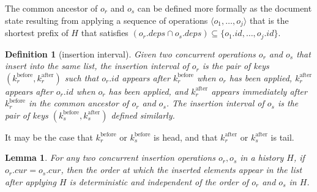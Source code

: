 \documentclass[10pt,journal,compsoc]{IEEEtran}
\newtheorem{definition}{Definition}
\newtheorem{lemma}[theorem]{Lemma}
\begin{document}
The common ancestor of $o_r$ and $o_s$ can be defined more formally as the document state resulting from applying a sequence of operations $\langle o_1, \dots, o_j \rangle$ that is the shortest prefix of $H$ that satisfies $(o_r.\mathit{deps} \cap o_s.\mathit{deps}) \subseteq \{o_1.\mathit{id}, \dots, o_j.\mathit{id}\}$.

\begin{definition}[insertion interval]\label{def:insert-interval}
Given two concurrent operations $o_r$ and $o_s$ that insert into the same list, the \emph{insertion interval} of $o_r$ is the pair of keys $(k_r^\mathrm{before}, k_r^\mathrm{after})$ such that $o_r.\mathit{id}$ appears after $k_r^\mathrm{before}$ when $o_r$ has been applied, $k_r^\mathrm{after}$ appears after $o_r.\mathit{id}$ when $o_r$ has been applied, and $k_r^\mathrm{after}$ appears immediately after $k_r^\mathrm{before}$ in the common ancestor of $o_r$ and $o_s$. The insertion interval of $o_s$ is the pair of keys $(k_s^\mathrm{before}, k_s^\mathrm{after})$ defined similarly.
\end{definition}

It may be the case that $k_r^\mathrm{before}$ or $k_s^\mathrm{before}$ is \textsf{head}, and that $k_r^\mathrm{after}$ or $k_s^\mathrm{after}$ is \textsf{tail}.

\begin{lemma}\label{lem:insert-conflict}
For any two concurrent insertion operations $o_r, o_s$ in a history $H$, if $o_r.\mathit{cur} = o_s.\mathit{cur}$, then the order at which the inserted elements appear in the list after applying $H$ is deterministic and independent of the order of $o_r$ and $o_s$ in $H$.
\end{lemma}
\end{document}
